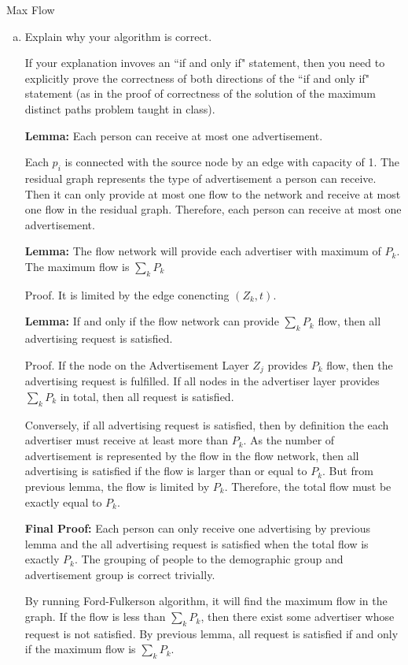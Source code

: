 \documentclass{article}
\numberwithin{table}{section}
\numberwithin{figure}{section}
\begin{document}
\begin{section}{Max Flow}
\begin{enumerate}[(a)]
    \item Explain why your algorithm is correct.
    
    If your explanation invoves an ``if and only if" statement, then you need to explicitly prove the correctness of both directions of the ``if and only if" statement (as in the proof of correctness of the solution of the maximum distinct paths problem taught in class).

    \begin{tcolorbox}
        \textbf{Lemma:} Each person can receive at most one advertisement. 

        Each $p_i$ is connected with the source node by an edge with capacity of 1. The residual graph represents the type of advertisement a person can receive. Then it can only provide at most one flow to the network and receive at most one flow in the residual graph. Therefore, each person can receive at most one advertisement.

        \textbf{Lemma:} The flow network will provide each advertiser with maximum of $P_k$. The maximum flow is $\sum_k P_k$

        Proof. It is limited by the edge conencting $(Z_k, t)$.

        \textbf{Lemma:} If and only if the flow network can provide $\sum_k P_k$ flow, then all advertising request is satisfied.

        Proof. If the node on the Advertisement Layer $Z_j$ provides $P_k$ flow, then the advertising request is fulfilled. If all nodes in the advertiser layer provides $\sum_k P_k$ in total, then all request is satisfied. 
        
        Conversely, if all advertising request is satisfied, then by definition the each advertiser must receive at least more than $P_k$. As the number of advertisement is represented by the flow in the flow network, then all advertising is satisfied if the flow is larger than or equal to $P_k$. But from previous lemma, the flow is limited by $P_k$. Therefore, the total flow must be exactly equal to $P_k$.

        \textbf{Final Proof:} Each person can only receive one advertising by previous lemma and the all advertising request is satisfied when the total flow is exactly $P_k$. The grouping of people to the demographic group and advertisement group is correct trivially. 

        By running Ford-Fulkerson algorithm, it will find the maximum flow in the graph. 
        If the flow is less than $\sum_k P_k$, then there exist some advertiser whose request is not satisfied.
        By previous lemma, all request is satisfied if and only if the maximum flow is $\sum_k P_k$.
    \end{tcolorbox}


\end{enumerate}
\end{section}
\end{document}
